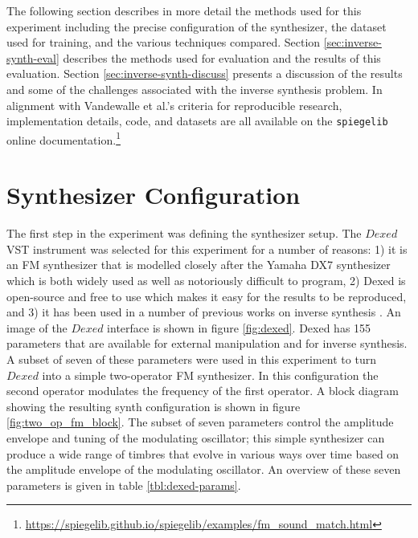 


The following section describes in more detail the methods used for this experiment including the precise configuration of the synthesizer, the dataset used for training, and the various techniques compared. Section \ref{sec:inverse-synth-eval} describes the methods used for evaluation and the results of this evaluation. Section \ref{sec:inverse-synth-discuss} presents a discussion of the results and some of the challenges associated with the inverse synthesis problem. In alignment with Vandewalle et al.'s criteria for reproducible research, implementation details, code, and datasets are all available on the \texttt{spiegelib} online documentation.\footnote{\url{https://spiegelib.github.io/spiegelib/examples/fm_sound_match.html}}

\section{Synthesizer Configuration}
The first step in the experiment was defining the synthesizer setup. The $Dexed$ VST instrument was selected for this experiment for a number of reasons: 1) it is an FM synthesizer that is modelled closely after the Yamaha DX7 synthesizer which is both widely used as well as notoriously difficult to program, 2) Dexed is open-source and free to use which makes it easy for the results to be reproduced, and 3) it has been used in a number of previous works on inverse synthesis \cite{yee2018automatic, luke2019stochastic, le2021improving, masudo2021quality}. An image of the $Dexed$ interface is shown in figure \ref{fig:dexed}. Dexed has 155 parameters that are available for external manipulation and for inverse synthesis. A subset of seven of these parameters were used in this experiment to turn $Dexed$ into a simple two-operator FM synthesizer. In this configuration the second operator modulates the frequency of the first operator. A block diagram showing the resulting synth configuration is shown in figure \ref{fig:two_op_fm_block}. The subset of seven parameters control the amplitude envelope and tuning of the modulating oscillator; this simple synthesizer can produce a wide range of timbres that evolve in various ways over time based on the amplitude envelope of the modulating oscillator. An overview of these seven parameters is given in table \ref{tbl:dexed-params}.

